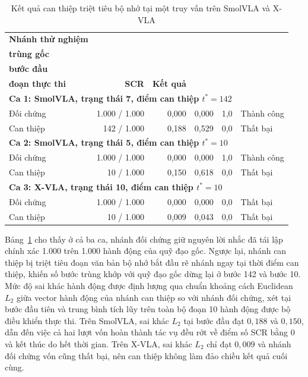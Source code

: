 \begin{table}[htbp]
\centering\small
\caption{Kết quả can thiệp triệt tiêu bộ nhớ tại một truy vấn trên SmolVLA và X-VLA}
\label{tab:e45-one-query}
\setlength{\tabcolsep}{3.5pt}
\begin{tabular}{|l|r|r|r|c|l|}
\hline
\textbf{Nhánh thử nghiệm} & \shortstack{\textbf{Số bước}\\\textbf{trùng gốc}} & \shortstack{\textbf{Sai khác $L_2$}\\\textbf{bước đầu}} & \shortstack{\textbf{Sai khác $L_2$}\\\textbf{đoạn thực thi}} & \textbf{SCR} & \textbf{Kết quả} \\ \hline
\multicolumn{6}{|l|}{\textbf{Ca 1: SmolVLA, trạng thái 7, điểm can thiệp $t^* = 142$ }} \\ \hline
Đối chứng & 1.000 / 1.000 & 0,000 & 0,000 & 1,0 & Thành công \\ \hline
Can thiệp & 142 / 1.000   & 0,188 & 0,529 & 0,0 & Thất bại \\ \hline
\multicolumn{6}{|l|}{\textbf{Ca 2: SmolVLA, trạng thái 5, điểm can thiệp $t^* = 10$ }} \\ \hline
Đối chứng & 1.000 / 1.000 & 0,000 & 0,000 & 1,0 & Thành công \\ \hline
Can thiệp & 10 / 1.000    & 0,150 & 0,618 & 0,0 & Thất bại \\ \hline
\multicolumn{6}{|l|}{\textbf{Ca 3: X-VLA, trạng thái 10, điểm can thiệp $t^* = 10$}} \\ \hline
Đối chứng & 1.000 / 1.000 & 0,000 & 0,000 & 0,0 & Thất bại \\ \hline
Can thiệp & 10 / 1.000    & 0,009 & 0,043 & 0,0 & Thất bại \\ \hline
\end{tabular}
\par\smallskip
\end{table}

Bảng~\ref{tab:e45-one-query} cho thấy ở cả ba ca, nhánh đối chứng giữ nguyên lời nhắc đã tái lập chính xác 1.000 trên 1.000 hành động của quỹ đạo gốc. Ngược lại, nhánh can thiệp bị triệt tiêu đoạn văn bản bộ nhớ bắt đầu rẽ nhánh ngay tại thời điểm can thiệp, khiến số bước trùng khớp với quỹ đạo gốc dừng lại ở bước 142 và bước 10. Mức độ sai khác hành động được định lượng qua chuẩn khoảng cách Euclidean $L_2$ giữa vector hành động của nhánh can thiệp so với nhánh đối chứng, xét tại bước đầu tiên và trung bình tích lũy trên toàn bộ đoạn 10 hành động được bộ điều khiển thực thi. Trên SmolVLA, sai khác $L_2$ tại bước đầu đạt $0{,}188$ và $0{,}150$, dẫn đến việc cả hai lượt vốn hoàn thành tác vụ đều rớt về điểm số SCR bằng 0 và kết thúc do hết thời gian. Trên X-VLA, sai khác $L_2$ chỉ đạt $0{,}009$ và nhánh đối chứng vốn cũng thất bại, nên can thiệp không làm đảo chiều kết quả cuối cùng.

